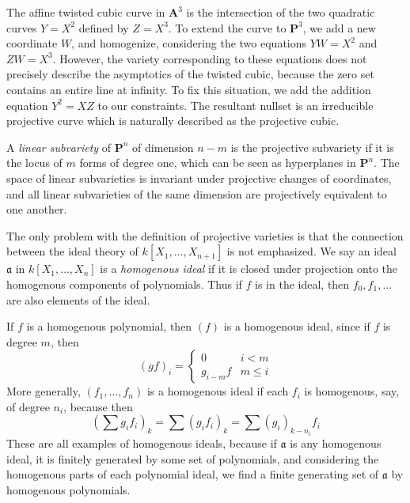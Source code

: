 \begin{example}
    The affine twisted cubic curve in $\mathbf{A}^3$ is the intersection of the two quadratic curves $Y = X^2$ defined by $Z = X^3$. To extend the curve to $\mathbf{P}^3$, we add a new coordinate $W$, and homogenize, considering the two equations $YW = X^2$ and $ZW = X^3$. However, the variety corresponding to these equations does not precisely describe the asymptotics of the twisted cubic, because the zero set contains an entire line at infinity. To fix this situation, we add the addition equation $Y^2 = XZ$ to our constraints. The resultant nullset is an irreducible projective curve which is naturally described as the projective cubic.
\end{example}

\begin{example}
    A \emph{linear subvariety} of $\mathbf{P}^n$ of dimension $n-m$ is the projective subvariety if it is the locus of $m$ forms of degree one, which can be seen as hyperplanes in $\mathbf{P}^n$. The space of linear subvarieties is invariant under projective changes of coordinates, and all linear subvarieties of the same dimension are projectively equivalent to one another.
\end{example}

The only problem with the definition of projective varieties is that the connection between the ideal theory of $k[X_1, \dots, X_{n+1}]$ is not emphasized. We say an ideal $\mathfrak{a}$ in $k[X_1, \dots, X_n]$ is a \emph{homogenous ideal} if it is closed under projection onto the homogenous components of polynomials. Thus if $f$ is in the ideal, then $f_0, f_1, \dots$ are also elements of the ideal.

\begin{example}
    If $f$ is a homogenous polynomial, then $(f)$ is a homogenous ideal, since if $f$ is degree $m$, then
    \[ (gf)_i = \begin{cases} 0 & i < m \\ g_{i-m}f & m \leq i \end{cases} \]
    More generally, $(f_1, \dots, f_n)$ is a homogenous ideal if each $f_i$ is homogenous, say, of degree $n_i$, because then
    \[ \left(\sum g_if_i \right)_k = \sum (g_if_i)_k = \sum (g_i)_{k - n_i} f_i \]
    These are all examples of homogenous ideals, because if $\mathfrak{a}$ is any homogenous ideal, it is finitely generated by some set of polynomials, and considering the homogenous parts of each polynomial ideal, we find a finite generating set of $\mathfrak{a}$ by homogenous polynomials.
\end{example}


